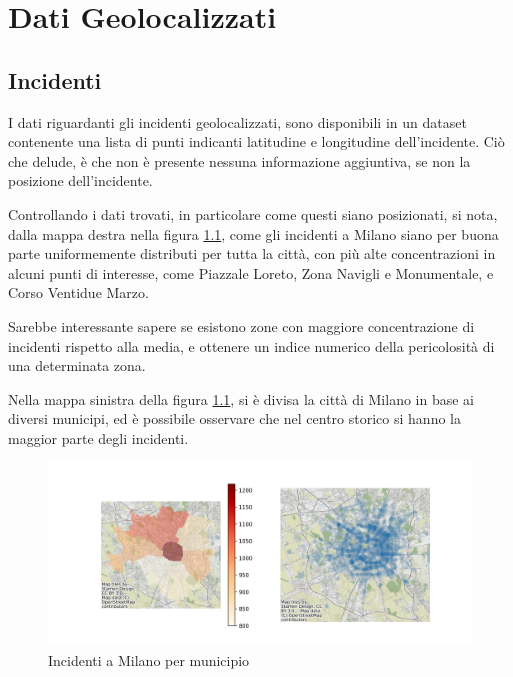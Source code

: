 \documentclass[a4paper,12pt]{report}
\begin{document}
\chapter{Dati Geolocalizzati}

\section{Incidenti}

I dati riguardanti gli incidenti geolocalizzati, sono disponibili in un dataset contenente una 
lista di punti indicanti latitudine e longitudine dell'incidente. 
Ciò che delude, è che non è presente nessuna informazione aggiuntiva, se non la posizione 
dell'incidente.

Controllando i dati trovati, in particolare come questi siano posizionati, 
si nota, dalla mappa destra nella figura \ref{fig:heatmap-municipi}, come gli incidenti a Milano 
siano per buona parte uniformemente distributi per tutta la città, 
con più alte concentrazioni in alcuni punti di interesse, come Piazzale Loreto, Zona Navigli 
e Monumentale, e Corso Ventidue Marzo.

Sarebbe interessante sapere se esistono zone con maggiore concentrazione di incidenti rispetto 
alla media, e ottenere un indice numerico della pericolosità di una determinata zona.

Nella mappa sinistra della figura \ref{fig:heatmap-municipi}, si è divisa la città di Milano 
in base ai diversi municipi, ed è possibile osservare che nel centro storico si hanno la 
maggior parte degli incidenti.

\begin{figure}
    \includegraphics[width=\linewidth]{../src/municipi_milano/incidenti_municipio.png}
    \caption{Incidenti a Milano per municipio}
    \label{fig:heatmap-municipi}
\end{figure}
\end{document}
